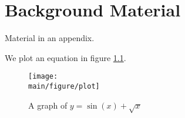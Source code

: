 \documentclass[\main/thesis.tex]{subfiles}
\begin{document}
\chapter{Background Material}

Material in an appendix.

We plot an equation in figure \ref{fig:plot}.

\begin{figure}
    \centering
    \texttt{[image: \\main/figure/plot]}
    \caption[A supporting figure] {A graph of $y = \sin(x) + \sqrt{x}$}
    \label{fig:plot}
\end{figure}
\end{document}

